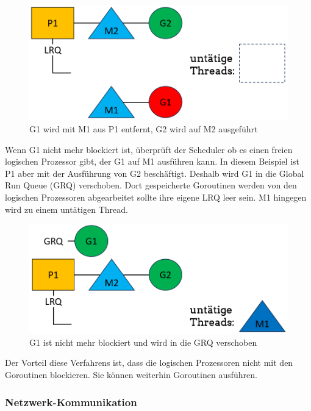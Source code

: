 \documentclass[fontsize=12pt,paper=a4,twoside=semi,parskip=half-,headsepline,headinclude]{scrreprt}
\begin{document}
\begin{figure}[h]
	\centering
	\includegraphics[scale=0.5]{figures/GoroutineSystemaufrufe2.png}
	\caption{G1 wird mit M1 aus P1 entfernt, G2 wird auf M2 ausgeführt}
	\label{fig:GoroutineSystemaufrufe2}
\end{figure}

Wenn G1 nicht mehr blockiert ist, überprüft der Scheduler ob es einen freien logischen Prozessor gibt, der G1 auf M1 ausführen kann. In diesem Beispiel ist P1 aber mit der Ausführung von G2 beschäftigt. Deshalb wird G1 in die Global Run Queue (GRQ) verschoben. Dort gespeicherte Goroutinen werden von den logischen Prozessoren abgearbeitet sollte ihre eigene LRQ leer sein. M1 hingegen wird zu einem untätigen Thread.

\begin{figure}[h]
	\centering
	\includegraphics[scale=0.5]{figures/GoroutineSystemaufrufe3.png}
	\caption{G1 ist nicht mehr blockiert und wird in die GRQ verschoben}
	\label{fig:GoroutineSystemaufrufe3}
\end{figure}

Der Vorteil diese Verfahrens ist, dass die logischen Prozessoren nicht mit den Goroutinen blockieren. Sie können weiterhin Goroutinen ausführen.

\subsubsection{Netzwerk-Kommunikation}
\end{document}
